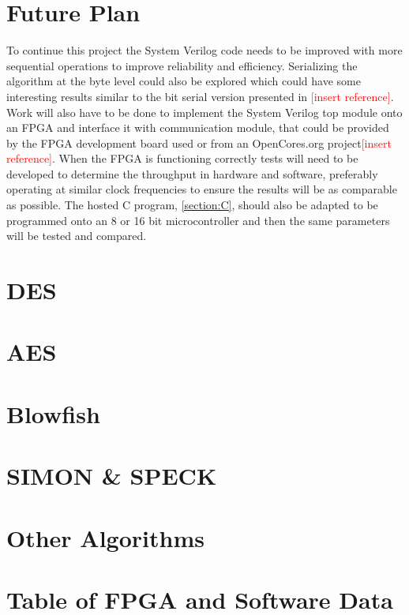 \documentclass[12pt,twoside,a4paper]{report}
\begin{document}
    \chapter{Future Plan}
    To continue this project the System Verilog code needs to be improved with more sequential operations to improve reliability and efficiency. Serializing the algorithm at the byte level could also be explored which could have some interesting results similar to the bit serial version presented in \textcolor{red}{[insert reference]}. Work will also have to be done to implement the System Verilog top module onto an FPGA and interface it with communication module, that could be provided by the FPGA development board used or from an OpenCores.org project\textcolor{red}{[insert reference]}. When the FPGA is functioning correctly tests will need to be developed to determine the throughput in hardware and software, preferably operating at similar clock frequencies to ensure the results will be as comparable as possible. The hosted C program, \autoref{section:C}, should also be adapted to be programmed onto an 8 or 16 bit microcontroller and then the same parameters will be tested and compared.
    
    \begin{thebibliography}{0}
    
    \end{thebibliography}
    
    \appendix
    
    \chapter{DES}
    
    \chapter{AES}

    \chapter{Blowfish}

    \chapter{SIMON \& SPECK}

    \chapter{Other Algorithms}

    \chapter{Table of FPGA and Software Data}
     
\end{document}
